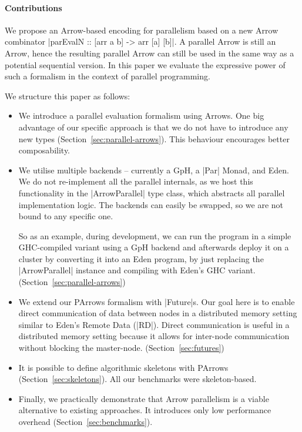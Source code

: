 \paragraph{Contributions}
%
%
We propose an Arrow-based encoding for parallelism based on a new Arrow combinator |parEvalN :: [arr a b] -> arr [a] [b]|. A parallel Arrow is still an Arrow, hence the resulting parallel Arrow can still be used in the same way as a potential sequential version. In this paper we evaluate the expressive power of such a formalism in the context of parallel programming.

We structure this paper as follows:
\begin{itemize}
\item We introduce a parallel evaluation formalism using Arrows. One big advantage of our specific approach is that we do not have to introduce any new types (Section~\ref{sec:parallel-arrows}). This behaviour encourages better composability.
\item We utilise multiple backends -- currently a GpH, a |Par| Monad, and Eden. We do not re-implement all the parallel internals, as we host this functionality in the |ArrowParallel| type class, which abstracts all parallel implementation logic. The backends can easily be swapped, so we are not bound to any specific one.

So as an example, during development, we can run the program in a simple GHC-compiled variant using a GpH backend and afterwards deploy it on a cluster by converting it into an Eden program, by just replacing the |ArrowParallel| instance and compiling with Eden's GHC variant. (Section~\ref{sec:parallel-arrows})
\item We extend our PArrows formalism with |Future|s. Our goal here is to enable direct communication of data between nodes in a distributed memory setting similar to Eden's Remote Data (|RD|). Direct communication is useful in a distributed memory setting because it allows for inter-node communication without blocking the master-node. (Section~\ref{sec:futures})
\item It is possible to define algorithmic skeletons with PArrows (Section~\ref{sec:skeletons}). All our benchmarks were skeleton-based.
\item Finally, we practically demonstrate that Arrow parallelism is a viable alternative to existing approaches. It introduces only low performance overhead (Section~\ref{sec:benchmarks}).
\end{itemize}

